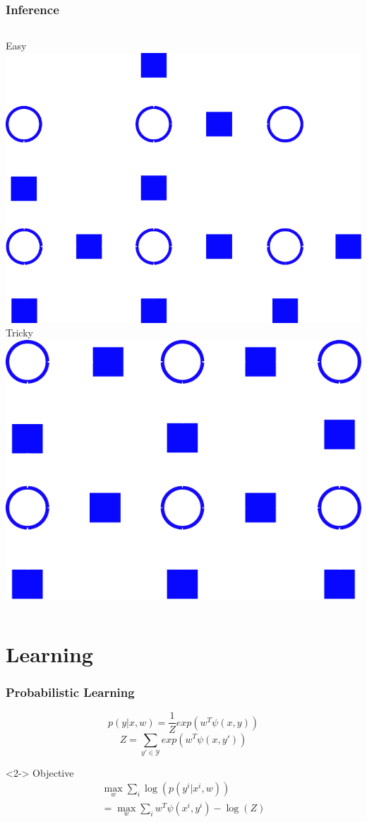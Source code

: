 \documentclass{beamer}
\newcommand{\hoch}[1]{^{#1}}
\begin{document}
    \begin{frame}
        \frametitle{Inference}
        \begin{columns}[t]
            Easy\\
            \vspace{5mm}
            \includegraphics[width=.8\textwidth]{images/tree}
            Tricky\\
            \vspace{5mm}
            \includegraphics[width=.8\textwidth]{images/grid}
        \end{columns}
    \end{frame}

    \section{Learning}
    \begin{frame}
        \frametitle{Probabilistic Learning}
        \[ p(y|x, w) = \frac{1}{Z} exp(w^T \psi(x, y))\]
        \[Z = \sum_{y' \in \mathcal{Y}} exp(w^T \psi(x, y')) \]
        \begin{visibleenv}<2->
        Objective
        \begin{align*}
            \max_w \sum_i \log(p(y\hoch{i} | x\hoch{i}, w))\\
            = \max_w \sum_i w^T \psi(x\hoch{i}, y\hoch{i}) - \log(Z)
        \end{align*}
        \end{visibleenv}

    \end{frame}
\end{document}
